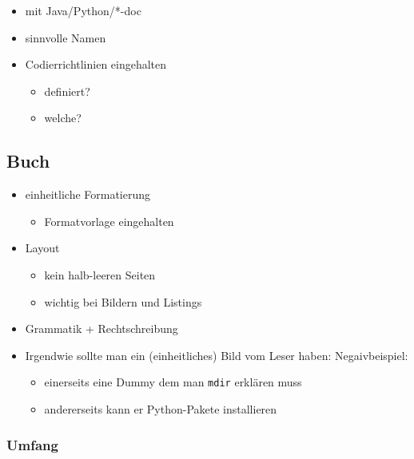 \begin{itemize}
\tightlist
\item
  mit Java/Python/*-doc
\item
  sinnvolle Namen
\item
  Codierrichtlinien eingehalten

  \begin{itemize}
  \tightlist
  \item
    definiert?
  \item
    welche?
  \end{itemize}
\end{itemize}

\hypertarget{buch}{%
\subsection{Buch}\label{buch}}

\begin{itemize}
\item
  einheitliche Formatierung

  \begin{itemize}
  \tightlist
  \item
    Formatvorlage eingehalten
  \end{itemize}
\item
  Layout

  \begin{itemize}
  \tightlist
  \item
    kein halb-leeren Seiten
  \item
    wichtig bei Bildern und Listings
  \end{itemize}
\item
  Grammatik + Rechtschreibung
\item
  Irgendwie sollte man ein (einheitliches) Bild vom Leser haben:\newline
  Negaivbeispiel:

  \begin{itemize}
  \tightlist
  \item
    einerseits eine Dummy dem man \texttt{mdir} erklären muss
  \item
    andererseits kann er Python-Pakete installieren
  \end{itemize}
\end{itemize}

\hypertarget{umfang}{%
\subsubsection{Umfang}\label{umfang}}

